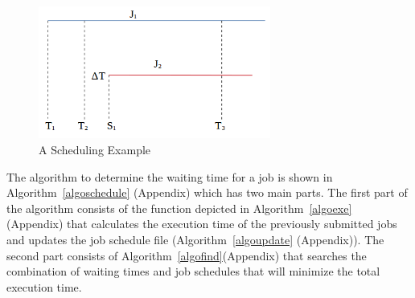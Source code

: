 \begin{figure}[!t]
\centering
\captionsetup{justification=centering}
\includegraphics[width=3in]{ScheExample.png}
\caption{A Scheduling Example}
\label{scheexample}
\end{figure}




\noindent




\noindent
The algorithm to determine the waiting time for a job is shown in Algorithm~\ref{algoschedule} (Appendix) which has two main parts. The first part of the algorithm consists of the function depicted in Algorithm~\ref{algoexe} (Appendix) that calculates the execution time of the previously submitted jobs and updates the job schedule file (Algorithm~\ref{algoupdate} (Appendix)). The second part consists of Algorithm~\ref{algofind}(Appendix) that searches the combination of waiting times and job schedules that will minimize the total execution time. 











